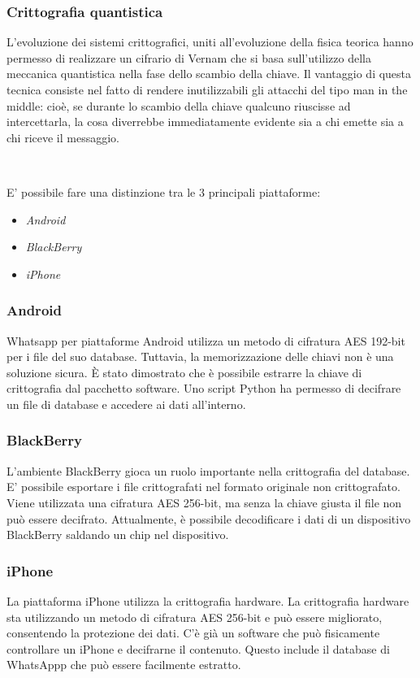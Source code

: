 \documentclass[a4paper,11pt]{book}
\begin{document}
\subsubsection{Crittografia quantistica}
L'evoluzione dei sistemi crittografici, uniti all'evoluzione della fisica teorica hanno permesso di realizzare un cifrario di Vernam che si basa sull'utilizzo della meccanica quantistica nella fase dello scambio della chiave. Il vantaggio di questa tecnica consiste nel fatto di rendere inutilizzabili gli attacchi del tipo man in the middle: cioè, se durante lo scambio della chiave qualcuno riuscisse ad intercettarla, la cosa diverrebbe immediatamente evidente sia a chi emette sia a chi riceve il messaggio.

~

E' possibile fare una distinzione tra le 3 principali piattaforme:

\begin{itemize}
	\item \textit{Android}

	\item \textit{BlackBerry}

	\item \textit{iPhone}

\end{itemize}
\subsubsection{Android}
Whatsapp per piattaforme Android utilizza un metodo di cifratura AES 192-bit per i file del suo database. 
Tuttavia, la memorizzazione delle chiavi non è una soluzione sicura. È stato dimostrato che è possibile estrarre la chiave di crittografia dal pacchetto software. Uno script Python ha permesso di decifrare un file di database e accedere ai dati all'interno.

\subsubsection{BlackBerry}
L'ambiente BlackBerry gioca un ruolo importante nella crittografia del database. E' possibile esportare i file crittografati nel formato originale non crittografato. Viene utilizzata una cifratura AES 256-bit, ma senza la chiave giusta il file non può essere decifrato. Attualmente, è possibile decodificare i dati di un dispositivo BlackBerry saldando un chip nel dispositivo.


\subsubsection{iPhone}
La piattaforma iPhone utilizza la crittografia hardware. La crittografia hardware sta utilizzando un metodo di cifratura AES 256-bit e può essere migliorato, consentendo la protezione dei dati. C'è già un software che può fisicamente controllare un iPhone e decifrarne il contenuto. Questo include il database di WhatsAppp che può essere facilmente estratto.
\end{document}
